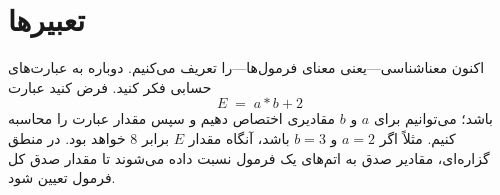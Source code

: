 \section*{ تعبیرها}

  اکنون معناشناسی—یعنی معنای فرمول‌ها—را تعریف می‌کنیم. دوباره به عبارت‌های حسابی فکر کنید. فرض کنید عبارت
  \[
  E\;=\;a * b + 2
  \]
  باشد؛ می‌توانیم برای $a$ و $b$ مقادیری اختصاص دهیم و سپس مقدار عبارت را محاسبه کنیم. مثلاً اگر $a=2$ و $b=3$ باشد، آنگاه مقدار $E$ برابر $8$ خواهد بود. در منطق گزاره‌ای، مقادیر صدق به اتم‌های یک فرمول نسبت داده می‌شوند تا مقدار صدق کل فرمول تعیین شود.




